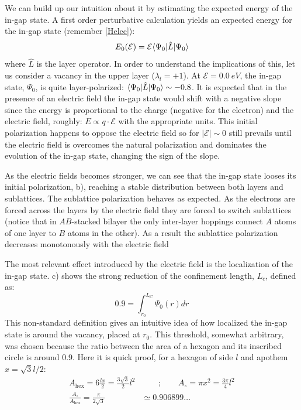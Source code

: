 We can build up our intuition about it by estimating the expected energy of the in-gap state. A first order perturbative calculation yields an expected energy for the in-gap state (remember \eqref{Helec}):
\begin{equation}
   E_0 (\mathcal{E}) = \mathcal{E} \langle\Psi_0|\hat{L}|\Psi_0\rangle
\end{equation}
where $\hat{L}$ is the layer operator. In order to understand the implications of this, let us consider a vacancy in the upper layer ($\lambda_l=+1$). At $\mathcal{E}=\SI{0.0}{eV}$, the in-gap state, $\Psi_0$, is quite layer-polarized: $\langle\Psi_0|\hat{L}|\Psi_0\rangle\sim-0.8$. It is expected that in the presence of an electric field the in-gap state would shift with a negative slope since the energy is proportional to the charge (negative for the electron) and the electric field, roughly: $E\propto q\cdot \mathcal{E}$ with the appropriate units. This initial polarization happens to oppose the electric field so for $|\mathcal{E}|\sim0$ still prevails until the electric field is overcomes the natural polarization and dominates the evolution of the in-gap state, changing the sign of the slope.


As the electric fields becomes stronger, we can see that the in-gap state looses its initial polarization, b), reaching a stable distribution between both layers and sublattices.
The sublattice polarization behaves as expected. As the electrons are forced across the layers by the electric field they are forced to switch sublattices (notice that in $AB$-stacked bilayer the only inter-layer hoppings connect $A$ atoms of one layer to $B$ atoms in the other). As a result the sublattice polarization decreases monotonously with the electric field

The most relevant effect introduced by the electric field is the localization of the in-gap state. c) shows the strong reduction of the confinement length, $L_c$, defined as:
\begin{equation}
  0.9 = \int_{r_0}^{L_C} \Psi_0(r) dr   %
\end{equation}
This non-standard definition gives an intuitive idea of how localized the in-gap state is around the vacancy, placed at $r_0$. This threshold, somewhat arbitrary, was chosen because the ratio between the area of a hexagon and its inscribed circle is around $0.9$. Here it is quick proof, for a hexagon of side $l$ and apothem $x=\sqrt{3}l/2$:
\begin{equation}
\begin{split}
   A_{\text{hex}} = 6\frac{lx}{2} = \frac{3\sqrt{3}}{2}l^2 &\qquad;\qquad
   A_{\circ} = \pi x^2 = \frac{3\pi}{4}l^2 \\
   \frac{A_\circ}{A_{\text{hex}}} = \frac{\pi}{2\sqrt{3}} &\simeq 0.906899\dots
\end{split}
\end{equation}


